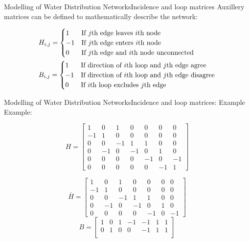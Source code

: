 \begin{frame}{Modelling of Water Distribution Networks}{Incidence and loop matrices}
Auxillery matrices can be defined to mathematically describe the network:


\begin{equation*}
	\begin{aligned}
		&H_{i,j} = \begin{cases}
			1 & \text{If $j$th edge leaves $i$th node}\\
			-1 & \text{If $j$th edge enters $i$th node} \\
			0 & \text{If $j$th edge and $i$th node unconnected} 
		\end{cases} \\
		&B_{i,j} = \begin{cases}
			1 & \text{If direction of $ i $th loop and} \text{ $j$th edge agree}\\
			-1 & \text{If direction of $ i $th loop and} \text{ $j$th edge disagree}\\
			0 & \text{If $ i $th loop excludes $ j $th edge}\\
		\end{cases}
	\end{aligned}
\end{equation*}

\end{frame}


\begin{frame}{Modelling of Water Distribution Networks}{Incidence and loop matrices: Example}
Example:

\begin{equation}
	H = \begin{bmatrix}
		1 & 0 & 1 & 0 & 0 & 0 & 0\\
		-1 & 1 & 0 & 0 & 0 & 0 & 0\\
		0 & 0 & -1 & 1 & 1 & 0 & 0\\
		0 & -1 & 0 & -1 & 0 & 1 & 0\\
		0 & 0 & 0 & 0 & -1 &  0  & -1\\
		0 & 0 & 0 & 0 & 0 & -1 & 1
	\end{bmatrix}
	\label{eq:H_simplified}
\end{equation} 

\begin{equation}
	\bar{H} = \begin{bmatrix}
		1 & 0 & 1 & 0 & 0 & 0 & 0\\
		-1 & 1 & 0 & 0 & 0 & 0 & 0\\
		0 & 0 & -1 & 1 & 1 & 0 & 0\\
		0 & -1 & 0 & -1 & 0 & 1 & 0\\
		0 & 0 & 0 & 0 & -1 &  0  & -1
	\end{bmatrix}
\end{equation}
\begin{equation}
	B = \begin{bmatrix}
		1 & 0 & 1 & -1 & -1 & 1 & 1\\
		0 & 1 & 0 & 0 & -1 & 1 & 1\\
	\end{bmatrix}
\end{equation}
\end{frame}


